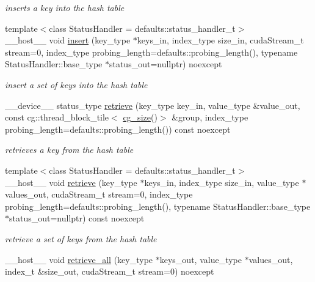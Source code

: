 \begin{DoxyCompactItemize}
\begin{DoxyCompactList}\small\item\em inserts a key into the hash table \end{DoxyCompactList}\item 
{\footnotesize template$<$class Status\+Handler  = defaults\+::status\+\_\+handler\+\_\+t$>$ }\\\+\_\+\+\_\+host\+\_\+\+\_\+ void \hyperlink{classwarpcore_1_1CountingHashTable_ad7fe01089dd9deb4d64f1938616df775}{insert} (key\+\_\+type $\ast$keys\+\_\+in, index\+\_\+type size\+\_\+in, cuda\+Stream\+\_\+t stream=0, index\+\_\+type probing\+\_\+length=defaults\+::probing\+\_\+length(), typename Status\+Handler\+::base\+\_\+type $\ast$status\+\_\+out=nullptr) noexcept
\begin{DoxyCompactList}\small\item\em insert a set of keys into the hash table \end{DoxyCompactList}\item 
\+\_\+\+\_\+device\+\_\+\+\_\+ status\+\_\+type \hyperlink{classwarpcore_1_1CountingHashTable_ab156b6726ca60e401fae990274b40cfc}{retrieve} (key\+\_\+type key\+\_\+in, value\+\_\+type \&value\+\_\+out, const cg\+::thread\+\_\+block\+\_\+tile$<$ \hyperlink{classwarpcore_1_1CountingHashTable_aeaf1b333eb176da987dee4d003e5dddc}{cg\+\_\+size}()$>$ \&group, index\+\_\+type probing\+\_\+length=defaults\+::probing\+\_\+length()) const noexcept
\begin{DoxyCompactList}\small\item\em retrieves a key from the hash table \end{DoxyCompactList}\item 
{\footnotesize template$<$class Status\+Handler  = defaults\+::status\+\_\+handler\+\_\+t$>$ }\\\+\_\+\+\_\+host\+\_\+\+\_\+ void \hyperlink{classwarpcore_1_1CountingHashTable_acdb02162545984460e58123720914003}{retrieve} (key\+\_\+type $\ast$keys\+\_\+in, index\+\_\+type size\+\_\+in, value\+\_\+type $\ast$values\+\_\+out, cuda\+Stream\+\_\+t stream=0, index\+\_\+type probing\+\_\+length=defaults\+::probing\+\_\+length(), typename Status\+Handler\+::base\+\_\+type $\ast$status\+\_\+out=nullptr) const noexcept
\begin{DoxyCompactList}\small\item\em retrieve a set of keys from the hash table \end{DoxyCompactList}\item 
\+\_\+\+\_\+host\+\_\+\+\_\+ void \hyperlink{classwarpcore_1_1CountingHashTable_a6505718055e8c14a56fa8c7a0d2b194c}{retrieve\+\_\+all} (key\+\_\+type $\ast$keys\+\_\+out, value\+\_\+type $\ast$values\+\_\+out, index\+\_\+t \&size\+\_\+out, cuda\+Stream\+\_\+t stream=0) noexcept

\end{DoxyCompactItemize}
